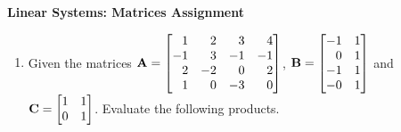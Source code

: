 \documentclass[9pt]{article}
\def\mf{\ensuremath\mathbf}
\def\mb{\ensuremath\mathbb}
\begin{document}
\begin{center}
\begin{Large}
\textbf{Linear Systems: Matrices Assignment}
\end{Large}
\end{center}
\vspace{0.2cm}

\begin{multicols}{2}
  \begin{enumerate}

    \item Given the matrices $\mf{A} = \begin{bmatrix*}[r]
    1 & 2 & 3 & 4\\
    -1 & 3 & -1 & -1\\
    2 & -2 & 0 & 2\\
    1 & 0 & -3 & 0\\
    \end{bmatrix*}$, $\mf{B} = \begin{bmatrix*}[r]
    -1 & 1\\
    0 & 1\\
    -1 & 1\\
    -0 & 1\\
    \end{bmatrix*}$ and $\mf{C} = \begin{bmatrix*}[r]
    1 & 1\\
    0 & 1\\
    \end{bmatrix*}$. Evaluate the following products.



\end{enumerate}
\end{multicols}
\end{document}
